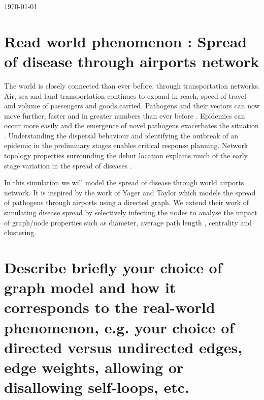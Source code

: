 \documentclass[a4paper,11pt]{article}
\begin{document}
\begin{titlepage}
{\large \today}\\[3cm] %


 

\vfill %

\end{titlepage}






\section{Read world phenomenon : Spread of disease through airports network} 


The world is closely connected than ever before, through transportation networks. Air, sea and land transportation continues to expand in reach, speed of travel and volume of passengers and goods carried. Pathogens and their vectors can now move further, faster and in greater numbers than ever before \cite{tatem2006global}. Epidemics can occur more easily and the emergence of novel pathogens exacerbates the situation \cite{jones2008global}. Understanding the dispersal behaviour and identifying the outbreak of an epidemic in the preliminary stages enables critical response planning. Network topology properties surrounding the debut location explains much of the early stage variation in the spread of diseases \cite{lawyer2016measuring}.

In this simulation we will model the spread of disease through world airports network. It is inspired by the work of Yager and Taylor \cite{nicholasyager2014} which models the spread of pathogens through airports using a directed graph. We extend their work of simulating disease spread by selectively infecting the nodes to analyse the impact of graph/node properties such as diameter, average path length , centrality and clustering. 

\section{Describe briefly your choice of graph model and how it corresponds to the real-world phenomenon, e.g. your choice of directed versus undirected edges, edge weights, allowing or disallowing self-loops, etc.}
\end{document}
